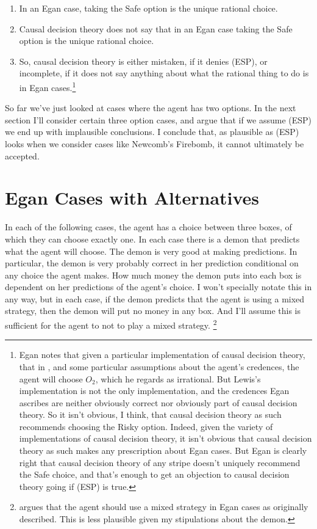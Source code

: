\begin{enumerate}
\item In an Egan case, taking the Safe option is the unique rational choice.
\item Causal decision theory does not say that in an Egan case taking the Safe option is the unique rational choice.
\item So, causal decision theory is either mistaken, if it denies (ESP), or incomplete, if it does not say anything about what the rational thing to do is in Egan cases.\footnote{Egan notes that given a particular implementation of causal decision theory, that in \citet{Lewis1981b}, and some particular assumptions about the agent's credences, the agent will choose $O_2$, which he regards as irrational. But Lewis's implementation is not the only implementation, and the credences Egan ascribes are neither obviously correct nor obviously part of causal decision theory. So it isn't obvious, I think, that causal decision theory as such recommends choosing the Risky option. Indeed, given the variety of implementations of causal decision theory, it isn't obvious that causal decision theory as such makes any prescription about Egan cases. But Egan is clearly right that causal decision theory of any stripe doesn't uniquely recommend the Safe choice, and that's enough to get an objection to causal decision theory going if (ESP) is true.}
\end{enumerate}

\noindent So far we've just looked at cases where the agent has two options. In the next section I'll consider certain three option cases, and argue that if we assume (ESP) we end up with implausible conclusions. I conclude that, as plausible as (ESP) looks when we consider cases like Newcomb's Firebomb, it cannot ultimately be accepted.

\section{Egan Cases with Alternatives}
In each of the following cases, the agent has a choice between three boxes, of which they can choose exactly one. In each case there is a demon that predicts what the agent will choose. The demon is very good at making predictions. In particular, the demon is very probably correct in her prediction conditional on any choice the agent makes. How much money the demon puts into each box is dependent on her predictions of the agent's choice. I won't specially notate this in any way, but in each case, if the demon predicts that the agent is using a mixed strategy, then the demon will put no money in any box. And I'll assume this is sufficient for the agent to not to play a mixed strategy. \footnote{\citet{Arntzenius2008} argues that the agent should use a mixed strategy in Egan cases as originally described. This is less plausible given my stipulations about the demon.}

